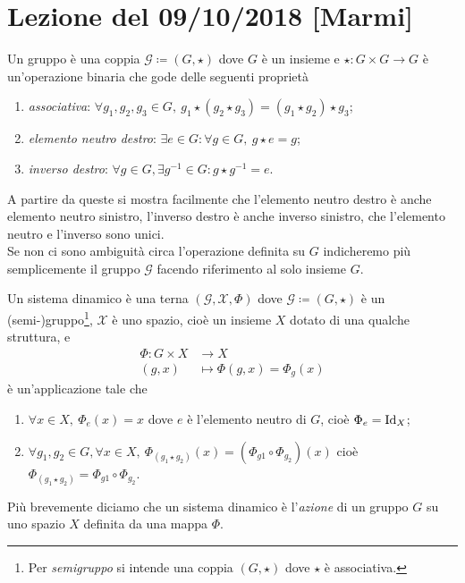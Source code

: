 \section{Lezione del 09/10/2018 [Marmi]}
\begin{definition}[gruppo]
	Un gruppo è una coppia $ \mathcal{G} \coloneqq (G, \star) $ dove $ G $ è un insieme e $ {\star \colon G \times G \to G} $ è un'operazione binaria che gode delle seguenti proprietà
	\begin{enumerate}[label=(\roman*)]
		\item \emph{associativa}: $ \forall g_1, g_2, g_3 \in G, \ g_1 \star (g_2 \star g_3) = (g_1 \star g_2) \star g_3 $;
		\item \emph{elemento neutro destro}: $  \exists e \in G : \forall g \in G, \ g \star e = g $;
		\item \emph{inverso destro}: $ \forall g \in G, \exists g^{-1} \in G : g \star g^{-1} = e $.
	\end{enumerate}
	A partire da queste si mostra facilmente che l'elemento neutro destro è anche elemento neutro sinistro, l'inverso destro è anche inverso sinistro, che l'elemento neutro e l'inverso sono unici. \\
	Se non ci sono ambiguità circa l'operazione definita su $ G $ indicheremo più semplicemente il gruppo $ \mathcal{G} $ facendo riferimento al solo insieme $ G $. 
\end{definition}

\begin{definition} \label{def:sistema-dinamico}
	Un sistema dinamico è una terna $ (\mathcal{G}, \mathcal{X}, \Phi) $ dove $ {\mathcal{G} \coloneqq (G, \star)} $ è un (semi-)gruppo\footnote{Per \emph{semigruppo} si intende una coppia $ (G,\star) $ dove $ \star $ è associativa.}, $ \mathcal{X} $ è uno spazio, cioè un insieme $ X $ dotato di una qualche struttura, e 
	\begin{align*}
		\Phi \colon G \times X & \to X \\
		(g, x) & \mapsto \Phi(g, x) = \Phi_g(x)
	\end{align*}
	è un'applicazione tale che
	\begin{enumerate}[label=(\roman*)]
		\item $ \forall x \in X, \ \Phi_e(x) = x $ dove $ e $ è l'elemento neutro di $ G $, cioè $ \Phi_e = \mathrm{Id}_X $;
		\item $ \forall g_1, g_2 \in G, \forall x \in X, \ \Phi_{(g_1 \star g_2)}(x) = (\Phi_{g1} \circ \Phi_{g_2})(x) $ cioè $ \Phi_{(g_1 \star g_2)} = \Phi_{g1} \circ \Phi_{g_2} $.
	\end{enumerate}
	Più brevemente diciamo che un sistema dinamico è l'\emph{azione} di un gruppo $ G $ su uno spazio $ X $ definita da una mappa $ \Phi $. 
\end{definition}

